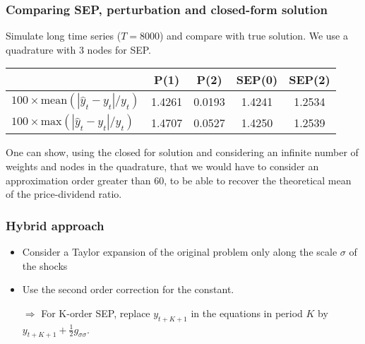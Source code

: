 \documentclass{beamer}
\begin{document}
\begin{frame}
   \frametitle{Comparing SEP, perturbation and closed-form solution}

   Simulate long time series ($T=8000$) and compare with true solution. We use a quadrature with 3 nodes for SEP.\newline

   \bigskip

   \begin{tabular}{l|cc|cc}
      \hline
                                                     & P(1)   & P(2)   & SEP(0) & SEP(2) \\ \hline
      $100\times\textrm{mean}(|\hat y_t - y_t|/y_t)$ & 1.4261 & 0.0193 & 1.4241 & 1.2534 \\
      $100\times\textrm{max}(|\hat y_t - y_t|/y_t)$  & 1.4707 & 0.0527 & 1.4250 & 1.2539 \\ \hline\hline
   \end{tabular}

   \bigskip\bigskip

   One can show, using the closed for solution and considering an infinite number of weights and nodes in the quadrature, that we would have to consider an approximation order greater than 60, to be able to recover the theoretical mean of the price-dividend ratio.


\end{frame}



\begin{frame}
   \frametitle{Hybrid approach}

   \begin{itemize}

      \item Consider a Taylor expansion of the original problem only along the scale $\sigma$ of the shocks\newline

      \item Use the second order correction for the constant.\newline

      \item[$\Rightarrow$] For K-order SEP, replace $y_{t+K+1}$ in the equations in period $K$ by $y_{t+K+1}+\frac{1}{2}g_{\sigma\sigma}$.\newline

   \end{itemize}

   \bigskip


\end{frame}
\end{document}
